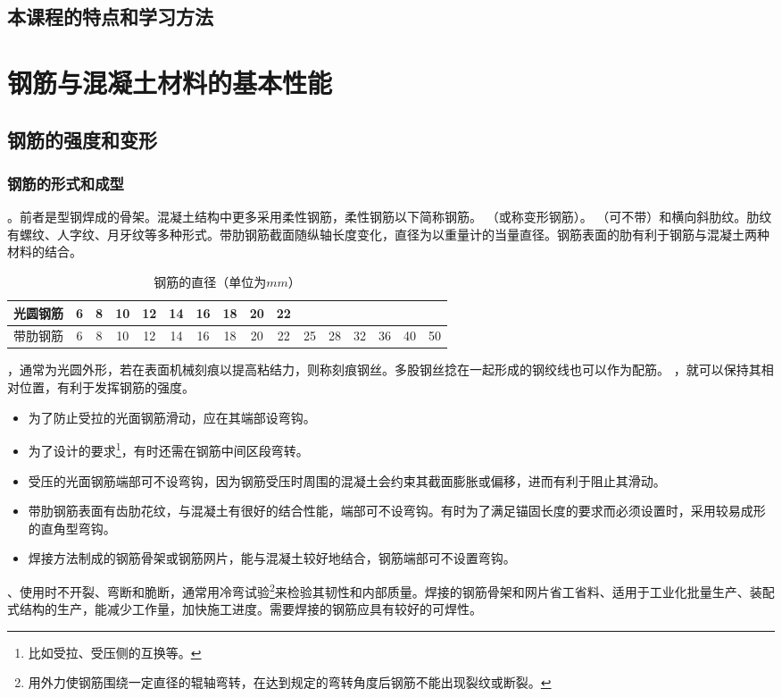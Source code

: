 \documentclass{article}
\begin{document}
\subsection{本课程的特点和学习方法}
\section{钢筋与混凝土材料的基本性能}
\subsection{钢筋的强度和变形}
\subsubsection{钢筋的形式和成型}
。前者是型钢焊成的骨架。混凝土结构中更多采用柔性钢筋，柔性钢筋以下简称钢筋。
（或称变形钢筋）。
（可不带）和横向斜肋纹。肋纹有螺纹、人字纹、月牙纹等多种形式。带肋钢筋截面随纵轴长度变化，直径为以重量计的当量直径。钢筋表面的肋有利于钢筋与混凝土两种材料的结合。
\begin{table}[htbp]
    \caption{钢筋的直径（单位为$mm$）}
    \begin{center}
        \begin{tabular}{|c|ccccccccc|cccccc|}
            \hline
            光圆钢筋 & 6 & 8 & 10 & 12 & 14 & 16 & 18 & 20 & 22 &    &    &    &    &    &    \\
            \hline
            带肋钢筋 & 6 & 8 & 10 & 12 & 14 & 16 & 18 & 20 & 22 & 25 & 28 & 32 & 36 & 40 & 50 \\
            \hline
        \end{tabular}
    \end{center}
\end{table}
，通常为光圆外形，若在表面机械刻痕以提高粘结力，则称刻痕钢丝。多股钢丝捻在一起形成的钢绞线也可以作为配筋。
，就可以保持其相对位置，有利于发挥钢筋的强度。
\begin{itemize}
    \item 为了防止受拉的光面钢筋滑动，应在其端部设弯钩。
    \item 为了设计的要求\footnote{比如受拉、受压侧的互换等。}，有时还需在钢筋中间区段弯转。
    \item 受压的光面钢筋端部可不设弯钩，因为钢筋受压时周围的混凝土会约束其截面膨胀或偏移，进而有利于阻止其滑动。
    \item 带肋钢筋表面有齿肋花纹，与混凝土有很好的结合性能，端部可不设弯钩。有时为了满足锚固长度的要求而必须设置时，采用较易成形的直角型弯钩。
    \item 焊接方法制成的钢筋骨架或钢筋网片，能与混凝土较好地结合，钢筋端部可不设置弯钩。
\end{itemize}
、使用时不开裂、弯断和脆断，通常用冷弯试验\footnote{用外力使钢筋围绕一定直径的辊轴弯转，在达到规定的弯转角度后钢筋不能出现裂纹或断裂。}来检验其韧性和内部质量。焊接的钢筋骨架和网片省工省料、适用于工业化批量生产、装配式结构的生产，能减少工作量，加快施工进度。需要焊接的钢筋应具有较好的可焊性。
\end{document}
